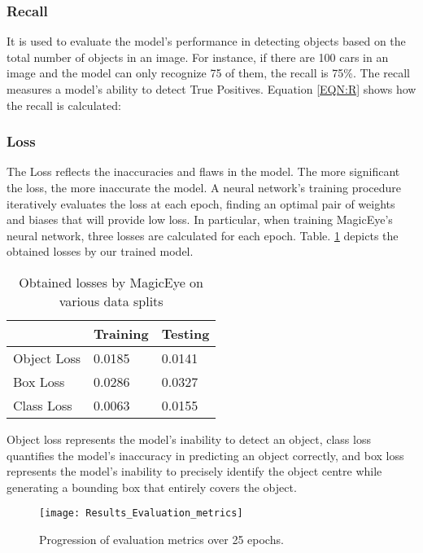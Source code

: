 \documentclass[journal,12pt,onecolumn,letterpaper]{IEEEtran}
\begin{document}
\subsubsection{Recall}
It is used to evaluate the model's performance in detecting objects based on the total number of objects in an image. For instance, if there are 100 cars in an image and the model can only recognize 75 of them, the recall is 75\%. The recall measures a model's ability to detect True Positives. Equation \ref{EQN:R} shows how the recall is calculated:


\subsubsection{Loss}
The Loss reflects the inaccuracies and flaws in the model. The more significant the loss, the more inaccurate the model. A neural network's training procedure iteratively evaluates the loss at each epoch, finding an optimal pair of weights and biases that will provide low loss. In particular, when training MagicEye's neural network, three losses are calculated for each epoch. Table. \ref{TBL:Loss-Data-Splits} depicts the obtained losses by our trained model.

\begin{table}[htbp]
\centering
\caption{Obtained losses by MagicEye on various data splits}
\label{TBL:Loss-Data-Splits}
\begin{tabular}{ p{2cm} p{2cm} p{2cm}}
 \hline \hline
  &Training &Testing\\
  \hline
Object Loss &0.0185	&0.0141 \\
Box Loss    &0.0286	&0.0327\\
Class Loss  &0.0063	&0.0155\\
\hline
\end{tabular}
\end{table}

Object loss represents the model's inability to detect an object, class loss quantifies the model's inaccuracy in predicting an object correctly, and box loss represents the model's inability to precisely identify the object centre while generating a bounding box that entirely covers the object.

\begin{figure*}[htbp]
\centering
	\texttt{[image: Results\_Evaluation\_metrics]}
\caption{Progression of evaluation metrics over 25 epochs.}
\label{FIG:Results_Evaluation_metrics}
\end{figure*}
\end{document}
